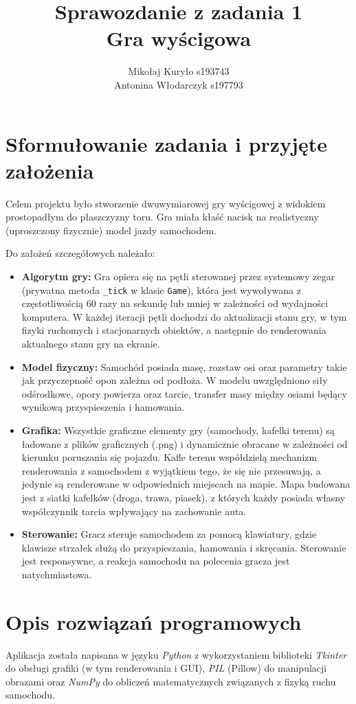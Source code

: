 \documentclass{article}
\title{Sprawozdanie z zadania 1\\\textbf{Gra wyścigowa}}
\author{Mikołaj Kuryło s193743\\Antonina Włodarczyk s197793}
\date{}
\begin{document}
\maketitle
\vspace{1cm}

\section{Sformułowanie zadania i przyjęte założenia}
Celem projektu było stworzenie dwuwymiarowej gry wyścigowej z widokiem prostopadłym do płaszczyzny toru. Gra miała kłaść nacisk na realistyczny (uproszczony fizycznie) model jazdy samochodem.\par
Do założeń szczegółowych należało:
\begin{itemize}
    \item \textbf{Algorytm gry:} Gra opiera się na pętli sterowanej przez systemowy zegar (prywatna metoda \texttt{\_tick} w klasie \texttt{Game}), która jest wywoływana z częstotliwością 60 razy na sekundę lub mniej w zależności od wydajności komputera. W każdej iteracji pętli dochodzi do aktualizacji stanu gry, w tym fizyki ruchomych i stacjonarnych obiektów, a następnie do renderowania aktualnego stanu gry na ekranie.
    \item \textbf{Model fizyczny:} Samochód posiada masę, rozstaw osi oraz parametry takie jak przyczepność opon zależna od podłoża. W modelu uwzględniono siły odśrodkowe, opory powierza oraz tarcie, transfer masy między osiami będący wynikową przyspieszenia i hamowania.
    \item \textbf{Grafika:} Wszystkie graficzne elementy gry (samochody, kafelki terenu) są ładowane z plików graficznych (.png) i dynamicznie obracane w zależności od kierunku poruszania się pojazdu. Kafle terenu współdzielą mechanizm renderowania z samochodem z wyjątkiem tego, że się nie przesuwają, a jedynie są renderowane w odpowiednich miejscach na mapie. Mapa budowana jest z siatki kafelków (droga, trawa, piasek), z których każdy posiada własny współczynnik tarcia wpływający na zachowanie auta.
    \item \textbf{Sterowanie:} Gracz steruje samochodem za pomocą klawiatury, gdzie klawisze strzałek służą do przyspieszania, hamowania i skręcania. Sterowanie jest responsywne, a reakcja samochodu na polecenia gracza jest natychmiastowa.
\end{itemize}

\section{Opis rozwiązań programowych}
Aplikacja została napisana w języku \textit{Python} z wykorzystaniem biblioteki \textit{Tkinter} do obsługi grafiki (w tym renderowania i GUI), \textit{PIL} (Pillow) do manipulacji obrazami oraz \textit{NumPy} do obliczeń matematycznych związanych z fizyką ruchu samochodu.\par
\end{document}
